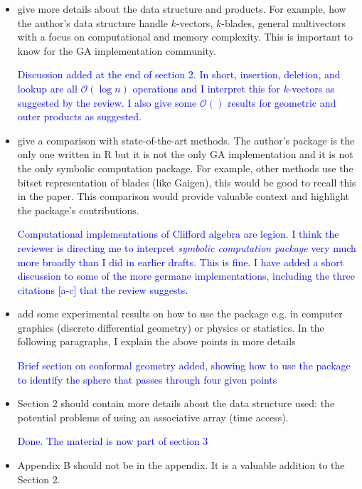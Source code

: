 \documentclass{article}
\begin{document}
\begin{itemize}
\item give more details about the data structure and products.  For
  example, how the author's data structure handle $k$-vectors,
  $k$-blades, general multivectors with a focus on computational and
  memory complexity.  This is important to know for the GA
  implementation community.

\textcolor{blue}{Discussion added at the end of section 2.  In short,
  insertion, deletion, and lookup are all $\mathcal{O}(\log n)$
  operations and I interpret this for $k$-vectors as suggested by the
  review.  I also give some $\mathcal{O}()$ results for geometric and
  outer products as suggested.}

\item give a comparison with state-of-the-art methods.  The author's
  package is the only one written in R but it is not the only GA
  implementation and it is not the only symbolic computation
  package.  For example, other methods use the bitset representation of
  blades (like Gaigen), this would be good to recall this in the
  paper.  This comparison would provide valuable context and highlight
  the package's contributions.

\textcolor{blue}{Computational implementations of Clifford algebra are
  legion.  I think the reviewer is directing me to interpret {\em symbolic
  computation package} very much more broadly than I did in earlier
  drafts.  This is fine.  I have added a short discussion to some of
  the more germane implementations, including the three citations
  [a-c] that the review suggests.}
  
\item add some experimental results on how to use the package e.g. in
  computer graphics (discrete differential geometry) or physics or
  statistics.  In the following paragraphs, I explain the above points
  in more details

\textcolor{blue}{Brief section on conformal geometry added, showing
  how to use the package to identify the sphere that passes through
  four given points}

\item Section 2 should contain more details about the data structure
  used: the potential problems of using an associative array (time
  access).

    \textcolor{blue}{Done.  The material is now part of section 3}

\item Appendix B should not be in the appendix.  It is a valuable
  addition to the Section 2.


\end{itemize}
\end{document}
